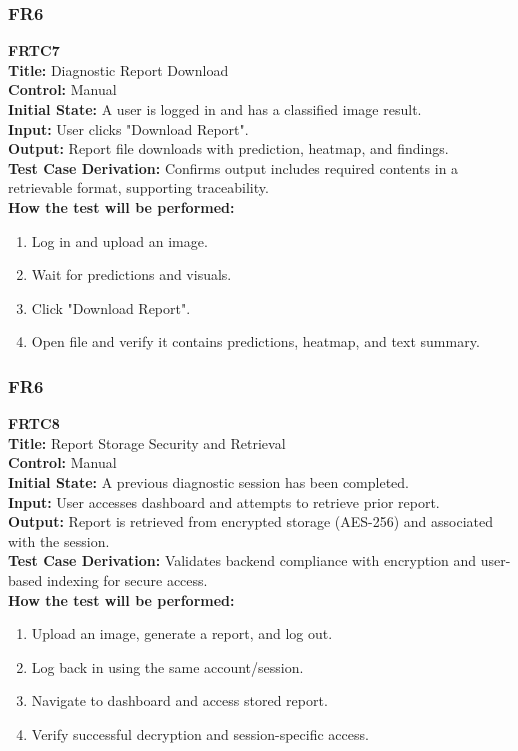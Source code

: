 \documentclass[12pt, titlepage]{article}
\begin{document}
\vspace{1em}
\subsubsection{FR6}
\textbf{FRTC7}\\
\textbf{Title:} Diagnostic Report Download\\
\textbf{Control:} Manual\\
\textbf{Initial State:} A user is logged in and has a classified image result.\\
\textbf{Input:} User clicks "Download Report".\\
\textbf{Output:} Report file downloads with prediction, heatmap, and findings.\\
\textbf{Test Case Derivation:} Confirms output includes required contents in a retrievable format, supporting traceability.\\
\textbf{How the test will be performed:}
\begin{enumerate}
  \item Log in and upload an image.
  \item Wait for predictions and visuals.
  \item Click "Download Report".
  \item Open file and verify it contains predictions, heatmap, and text summary.
\end{enumerate}

\vspace{1em}
\subsubsection{FR6}
\textbf{FRTC8}\\
\textbf{Title:} Report Storage Security and Retrieval\\
\textbf{Control:} Manual\\
\textbf{Initial State:} A previous diagnostic session has been completed.\\
\textbf{Input:} User accesses dashboard and attempts to retrieve prior report.\\
\textbf{Output:} Report is retrieved from encrypted storage (AES-256) and associated with the session.\\
\textbf{Test Case Derivation:} Validates backend compliance with encryption and user-based indexing for secure access.\\
\textbf{How the test will be performed:}
\begin{enumerate}
  \item Upload an image, generate a report, and log out.
  \item Log back in using the same account/session.
  \item Navigate to dashboard and access stored report.
  \item Verify successful decryption and session-specific access.
\end{enumerate}
\end{document}
